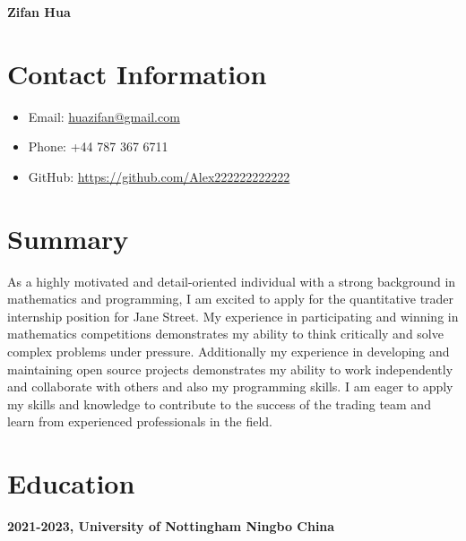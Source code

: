 \documentclass{article}
\begin{document}
\begin{center}
    \textbf{\Large Zifan Hua}
\end{center}

\section*{Contact Information}
\begin{itemize}[leftmargin=*]
    \item Email: \href{mailto:huazifan@gmail.com}{huazifan@gmail.com}
    \item Phone: +44 787 367 6711
    \item GitHub: \href{https://github.com/Alex222222222222}{https://github.com/Alex222222222222}
\end{itemize}

\section*{Summary}
As a highly motivated and detail-oriented individual with a strong background in mathematics and programming, I am excited to apply for the quantitative trader internship position for Jane Street. 
My experience in participating and winning in mathematics competitions demonstrates my ability to think critically and solve complex problems under pressure.
Additionally my experience in developing and maintaining open source projects demonstrates my ability to work independently and collaborate with others and also my programming skills.
I am eager to apply my skills and knowledge to contribute to the success of the trading team and learn from experienced professionals in the field.

\section*{Education}
\textbf{2021-2023, University of Nottingham Ningbo China}
\end{document}
